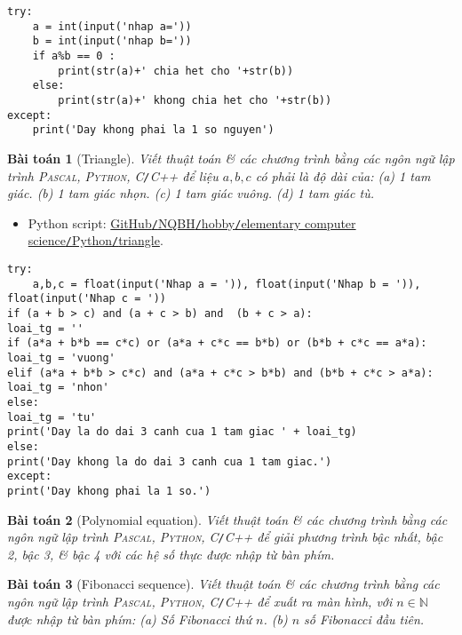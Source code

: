 \documentclass{article}
\newtheorem{baitoan}{Bài toán}
\begin{document}
\begin{verbatim}
try:
    a = int(input('nhap a='))
    b = int(input('nhap b='))
    if a%b == 0 :
        print(str(a)+' chia het cho	'+str(b))
    else:
        print(str(a)+' khong chia het cho '+str(b))
except:
    print('Day khong phai la 1 so nguyen')
\end{verbatim}

\begin{baitoan}[Triangle]
	Viết thuật toán \& các chương trình bằng các ngôn ngữ lập trình \textsc{Pascal, Python, C\texttt{/}C++} để liệu $a,b,c$ có phải là độ dài của: (a) 1 tam giác. (b) 1 tam giác nhọn. (c) 1 tam giác vuông. (d) 1 tam giác tù.
\end{baitoan}

\begin{itemize}
	\item Python script: \href{https://github.com/NQBH/hobby/blob/master/elementary_computer_science/Python/triangle.py}{GitHub\texttt{/}NQBH\texttt{/}hobby\texttt{/}elementary computer science\texttt{/}Python\texttt{/}triangle}.
\end{itemize}

\begin{verbatim}
try:
    a,b,c = float(input('Nhap a = ')), float(input('Nhap b = ')), float(input('Nhap c = '))
if (a + b > c) and (a + c > b) and  (b + c > a):
loai_tg = ''
if (a*a + b*b == c*c) or (a*a + c*c == b*b) or (b*b + c*c == a*a):
loai_tg = 'vuong'
elif (a*a + b*b > c*c) and (a*a + c*c > b*b) and (b*b + c*c > a*a):
loai_tg = 'nhon'
else:
loai_tg = 'tu'
print('Day la do dai 3 canh cua 1 tam giac ' + loai_tg)
else: 
print('Day khong la do dai 3 canh cua 1 tam giac.')			
except:
print('Day khong phai la 1 so.')
\end{verbatim}

\begin{baitoan}[Polynomial equation]
	Viết thuật toán \& các chương trình bằng các ngôn ngữ lập trình \textsc{Pascal, Python, C\texttt{/}C++} để giải phương trình bậc nhất, bậc 2, bậc 3, \& bậc 4 với các hệ số thực được nhập từ bàn phím.
\end{baitoan}

\begin{baitoan}[Fibonacci sequence]
	Viết thuật toán \& các chương trình bằng các ngôn ngữ lập trình \textsc{Pascal, Python, C\texttt{/}C++} để xuất ra màn hình, với $n\in\mathbb{N}$ được nhập từ bàn phím: (a) Số Fibonacci thứ $n$. (b) $n$ số Fibonacci đầu tiên.
\end{baitoan}
\end{document}
